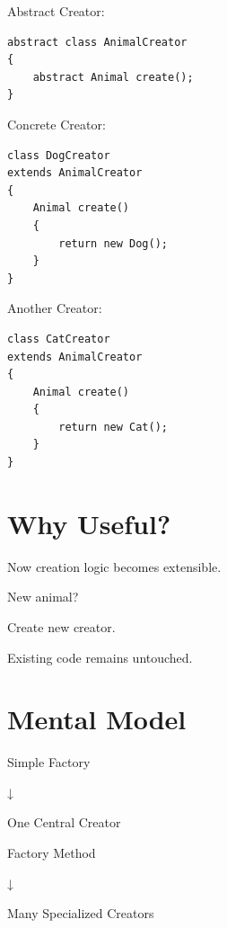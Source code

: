 \documentclass[11pt,a4paper]{book}
\begin{document}
Abstract Creator:

\begin{verbatim}
abstract class AnimalCreator
{
    abstract Animal create();
}
\end{verbatim}


Concrete Creator:

\begin{verbatim}
class DogCreator
extends AnimalCreator
{
    Animal create()
    {
        return new Dog();
    }
}
\end{verbatim}


Another Creator:

\begin{verbatim}
class CatCreator
extends AnimalCreator
{
    Animal create()
    {
        return new Cat();
    }
}
\end{verbatim}


\section{Why Useful?}

Now creation logic becomes
extensible.


New animal?


Create new creator.


Existing code remains untouched.


\section{Mental Model}

\begin{mentalmodel}

Simple Factory

↓

One Central Creator

\vspace{0.5em}

Factory Method

↓

Many Specialized Creators

\end{mentalmodel}
\end{document}
